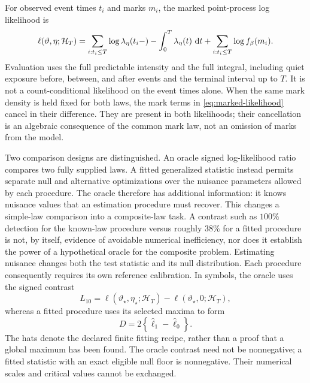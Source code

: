 For observed event times \(t_i\) and marks \(m_i\), the marked point-process log likelihood is
\begin{equation}
\ell(\vartheta,\eta;\mathcal H_T)
=
\sum_{i:t_i\le T}\log\lambda_\eta(t_i-)
-
\int_0^T\lambda_\eta(t)\,\mathop{}\!\mathrm{d} t
+
\sum_{i:t_i\le T}\log f_\beta(m_i).
\label{eq:marked-likelihood}
\end{equation}
Evaluation uses the full predictable intensity and the full integral, including quiet exposure before, between, and after events and the terminal interval up to \(T\). It is not a count-conditional likelihood on the event times alone. When the same mark density is held fixed for both laws, the mark terms in \eqref{eq:marked-likelihood} cancel in their difference. They are present in both likelihoods; their cancellation is an algebraic consequence of the common mark law, not an omission of marks from the model.

Two comparison designs are distinguished. An oracle signed log-likelihood ratio compares two fully supplied laws. A fitted generalized statistic instead permits separate null and alternative optimizations over the nuisance parameters allowed by each procedure. The oracle therefore has additional information: it knows nuisance values that an estimation procedure must recover. This changes a simple-law comparison into a composite-law task. A contrast such as \(100\%\) detection for the known-law procedure versus roughly \(38\%\) for a fitted procedure is not, by itself, evidence of avoidable numerical inefficiency, nor does it establish the power of a hypothetical oracle for the composite problem. Estimating nuisance changes both the test statistic and its null distribution. Each procedure consequently requires its own reference calibration. In symbols, the oracle uses the signed contrast
\begin{equation}
 L_{10}=\ell(\vartheta_\star,\eta_\star;\mathcal H_T)
        -\ell(\vartheta_\star,0;\mathcal H_T),
 \label{eq:oracle-statistic}
\end{equation}
whereas a fitted procedure uses its selected maxima to form
\begin{equation}
 D=2\left\{\widehat\ell_1-\widehat\ell_0\right\}.
 \label{eq:fitted-statistic}
\end{equation}
The hats denote the declared finite fitting recipe, rather than a proof that a global maximum has been found. The oracle contrast need not be nonnegative; a fitted statistic with an exact eligible null floor is nonnegative. Their numerical scales and critical values cannot be exchanged.

